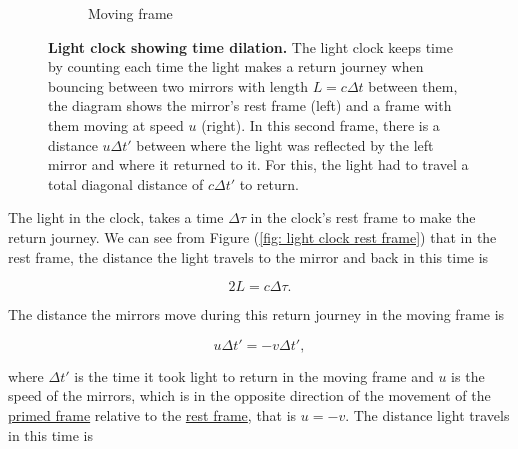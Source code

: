 \begin{figure}[H]
\begin{subfigure}{.49\textwidth}
		\caption{Moving frame}
	\end{subfigure}
	\caption{\textbf{Light clock showing time dilation.} The light clock keeps time by counting each time the light makes a return journey when bouncing between two mirrors with length ${L}={c}{\Delta t}$ between them, the diagram shows the mirror's rest frame (left) and a frame with them moving at speed ${u}$ (right). In this second frame, there is a distance ${u}{\Delta t{'}}$ between where the light was reflected by the left mirror and where it returned to it. For this, the light had to travel a total diagonal distance of ${c}{\Delta t{'}}$ to return.}
	\label{fig: light clock}
\end{figure}

The light in the clock, takes a time ${\Delta\tau}$ in the clock's rest frame to make the return journey.
We can see from Figure (\ref{fig: light clock rest frame}) that in the rest frame, the distance the light travels to the mirror and back in this time is

\begin{equation}
	2{L} = {c}{\Delta\tau}.
\end{equation}

The distance the mirrors move during this return journey in the moving frame is

\begin{equation}
	{u}{\Delta t{'}} =-{v} {\Delta t{'}},
\end{equation}

where ${\Delta t{'}}$ is the time it took light to return in the moving frame and ${u}$ is the speed of the mirrors, which is in the opposite direction of the movement of the \hyperlink{def-Primed-Frame}{primed frame} relative to the \hyperlink{def-proper-frame}{rest frame}, that is ${u} =-{v}$.
The distance light travels in this time is

